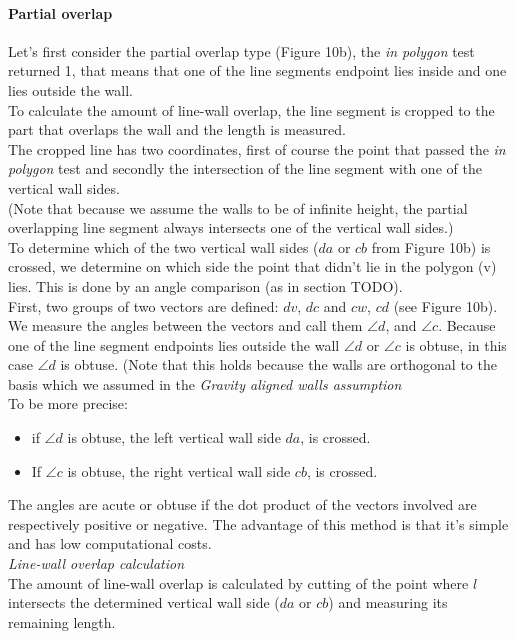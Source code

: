 \documentclass[10pt]{article}
\begin{document}
{	\paragraph{Partial overlap}
	Let's first consider the partial overlap type (Figure 10b), the \emph{in polygon} test
	returned 1, that means that one of the line segments endpoint lies inside
	and one lies outside the wall.\\
	To calculate the amount of line-wall overlap, the line segment is cropped to the
	part that overlaps the wall and the length is measured.\\
	The cropped line has two coordinates, first of course the point that passed
	the \emph{in polygon} test and secondly the intersection of the line
	segment with one of the vertical wall sides.\\
	(Note that because we assume the walls to be of infinite height, the 
	partial overlapping line segment always intersects one of the
	vertical wall sides.)\\
	To determine which of the two vertical wall sides ($da$ or $cb$ from Figure 10b)
	 is crossed, we determine on which side the point that didn't lie in the polygon (v) lies.
	This is done by an angle comparison (as in section TODO).\\
	First, two groups of two vectors are defined: $dv$, $dc$ and $cw$, $cd$ (see Figure 10b).
	We measure the angles between the vectors and call them $\angle d$, and
	$\angle c$. 
	Because one of the line segment endpoints lies outside
	the wall $\angle d$ or $\angle c$ is obtuse, in this case $\angle d$ is obtuse.
	(Note that this holds because the walls are orthogonal to the basis
	which we assumed in the \emph{Gravity aligned walls assumption}\\
	To be more precise: 
	\begin{itemize}
	\item if $\angle d$ is obtuse, the left vertical wall side $da$, is
	crossed. \\
	\item If $\angle c$ is obtuse, the right vertical wall side $cb$, is
	crossed. \\
	\end{itemize}
	The angles are acute or obtuse if the dot product of the vectors involved
	are respectively positive or negative. The advantage of this method is that
	it's simple and has low computational costs.\\
	
	\emph{Line-wall overlap calculation}\\
	The amount of line-wall overlap is calculated by cutting of the
	point where $l$ intersects the determined vertical wall side ($da$ or
	$cb$) and measuring its remaining length.\\

}
\end{document}
